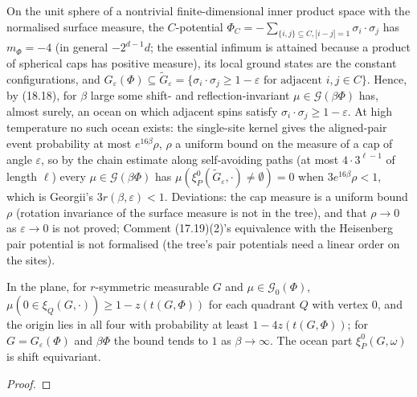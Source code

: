 \begin{example}
    On the unit sphere of a nontrivial finite-dimensional inner product space with the
    normalised surface measure, the $C$-potential $\Phi_C = -\sum_{\{i,j\} \subseteq C, |i-j|=1}
    \sigma_i\cdot\sigma_j$ has $m_\Phi = -4$ (in general $-2^{d-1}d$; the essential infimum is
    attained because a product of spherical caps has positive measure), its local ground states
    are the constant configurations, and $G_\varepsilon(\Phi) \subseteq \tilde G_\varepsilon =
    \{\sigma_i\cdot\sigma_j \geq 1 - \varepsilon \text{ for adjacent } i, j \in C\}$. Hence, by
    (18.18), for $\beta$ large some shift- and reflection-invariant $\mu \in \mathcal G(\beta\Phi)$
    has, almost surely, an ocean on which adjacent spins satisfy $\sigma_i\cdot\sigma_j \geq
    1 - \varepsilon$. At high temperature no such ocean exists: the single-site kernel gives the
    aligned-pair event probability at most $e^{16\beta}\rho$, $\rho$ a uniform bound on the
    measure of a cap of angle $\varepsilon$, so by the chain estimate along self-avoiding paths
    (at most $4\cdot 3^{\ell-1}$ of length $\ell$) every $\mu \in \mathcal G(\beta\Phi)$ has
    $\mu(\xi^0_P(\tilde G_\varepsilon,\cdot) \neq \emptyset) = 0$ when $3e^{16\beta}\rho < 1$, which
    is Georgii's $3r(\beta,\varepsilon) < 1$. Deviations: the cap measure is a uniform bound
    $\rho$ (rotation invariance of the surface measure is not in the tree), and that
    $\rho \to 0$ as $\varepsilon \to 0$ is not proved; Comment (17.19)(2)'s equivalence with the
    Heisenberg pair potential is not formalised (the tree's pair potentials need a linear order on
    the sites).
\end{example}

\begin{theorem}
    \label{thm:lo-18-18-quadrant}
    \leanok

    In the plane, for $r$-symmetric measurable $G$ and $\mu \in \mathcal G_0(\Phi)$,
    $\mu(0 \in \xi_Q(G,\cdot)) \geq 1 - z(t(G,\Phi))$ for each quadrant $Q$ with vertex $0$, and
    the origin lies in all four with probability at least $1 - 4z(t(G,\Phi))$; for
    $G = G_\varepsilon(\Phi)$ and $\beta\Phi$ the bound tends to $1$ as $\beta \to \infty$. The
    ocean part $\xi^0_P(G,\omega)$ is shift equivariant.
\end{theorem}
\begin{proof}
    \leanok
\end{proof}

